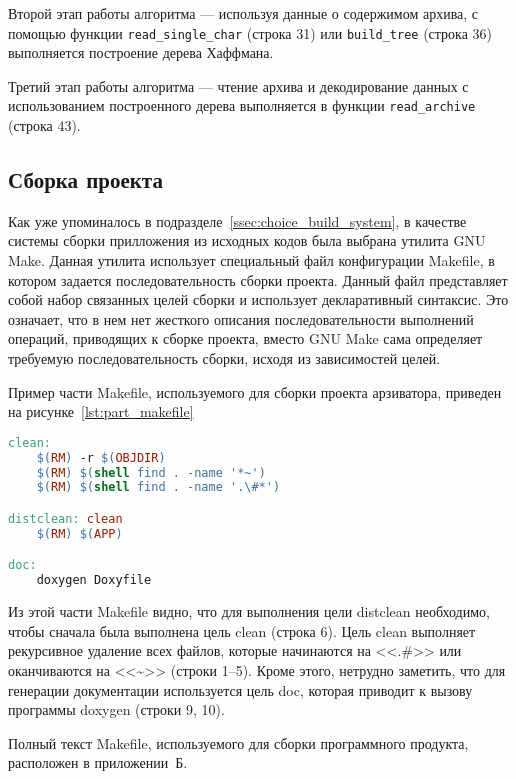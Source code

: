 Второй этап работы алгоритма --- используя данные о содержимом архива,
с помощью функции \texttt{read\_single\_char} (строка 31) или
\texttt{build\_tree} (строка 36) выполняется построение дерева Хаффмана.

Третий этап работы алгоритма --- чтение архива и декодирование данных
с использованием построенного дерева выполняется в функции \texttt{read\_archive}
(строка 43). 

\subsection{Сборка проекта}

Как уже упоминалось в подразделе~\ref{ssec:choice_build_system},
в качестве системы сборки прилложения из исходных кодов была выбрана утилита
GNU Make. Данная утилита использует специальный файл конфигурации Makefile,
в котором задается последовательность сборки проекта.
Данный файл представляет собой набор связанных целей сборки и 
использует декларативный синтаксис. 
Это означает, что в нем нет жесткого описания последовательности 
выполнений операций, приводящих к сборке проекта, вместо GNU Make
сама определяет требуемую последовательность сборки, 
исходя из зависимостей целей.

Пример части Makefile, используемого для сборки проекта арзиватора,
приведен на рисунке~\ref{lst:part_makefile}

\begin{lstlisting}[basicstyle=\scriptsize\ttfamily,
                   numberstyle=\scriptsize\ttfamily,
                   xleftmargin=7mm,
                   language=make,caption=Пример Makefile сборки проекта,
                   label=lst:part_makefile]
clean:
	$(RM) -r $(OBJDIR)
	$(RM) $(shell find . -name '*~')
	$(RM) $(shell find . -name '.\#*')

distclean: clean
	$(RM) $(APP)

doc: 
	doxygen Doxyfile
\end{lstlisting}

Из этой части Makefile видно, что для выполнения цели distclean необходимо,
чтобы сначала была выполнена цель clean (строка 6). Цель clean выполняет 
рекурсивное удаление всех файлов, 
которые начинаются на <<.\#>> или оканчиваются на <<\textasciitilde>> 
(строки 1--5). 
Кроме этого, нетрудно заметить, что для генерации документации используется 
цель doc, которая приводит к вызову программы doxygen (строки 9, 10).

Полный текст Makefile, используемого для сборки программного продукта, 
расположен в приложении~Б.

